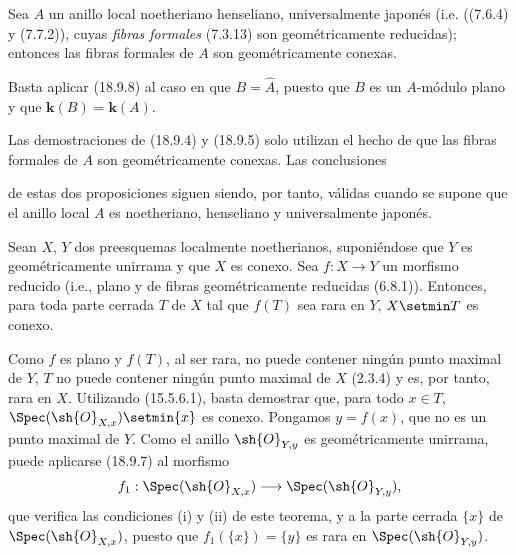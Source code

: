 \begin{corollary}[18.9.9]
\label{IV.18.9.9}
Sea $A$ un anillo local noetheriano henseliano, universalmente japonés \textup{(i.e. ((7.6.4) y (7.7.2)), cuyas \emph{fibras formales} (7.3.13) son geométricamente reducidas)}; entonces las fibras formales de $A$ son geométricamente conexas.
\end{corollary}

Basta aplicar (18.9.8) al caso en que $B=\widehat A$, puesto que $B$ es un $A$-módulo plano y que $\boldsymbol{k}(B)=\boldsymbol{k}(A)$.

\begin{remark}[18.9.10]
\label{IV.18.9.10}
Las demostraciones de (18.9.4) y (18.9.5) solo utilizan el hecho de que las fibras formales de $A$ son geométricamente conexas. Las conclusiones


de estas dos proposiciones siguen siendo, por tanto, válidas cuando se supone que el anillo local $A$ es noetheriano, henseliano y universalmente japonés.
\end{remark}

\begin{corollary}[18.9.11]
\label{IV.18.9.11}
Sean $X$, $Y$ dos preesquemas localmente noetherianos, suponiéndose que $Y$ es geométricamente unirrama y que $X$ es conexo. Sea $f:X\to Y$ un morfismo reducido \textup{(i.e., plano y de fibras geométricamente reducidas (6.8.1))}. Entonces, para toda parte cerrada $T$ de $X$ tal que $f(T)$ sea rara en $Y$, $X\setmin T$ es conexo.
\end{corollary}

Como $f$ es plano y $f(T)$, al ser rara, no puede contener ningún punto maximal de $Y$, $T$ no puede contener ningún punto maximal de $X$ (2.3.4) y es, por tanto, rara en $X$. Utilizando (15.5.6.1), basta demostrar que, para todo $x\in T$, $\Spec(\sh{O}_{X,x})\setmin\{x\}$ es conexo. Pongamos $y=f(x)$, que no es un punto maximal de $Y$. Como el anillo $\sh{O}_{Y,y}$ es geométricamente unirrama, puede aplicarse (18.9.7) al morfismo
\[
  f_1:\Spec(\sh{O}_{X,x})\longrightarrow\Spec(\sh{O}_{Y,y}),
\]
que verifica las condiciones (i) y (ii) de este teorema, y a la parte cerrada $\{x\}$ de $\Spec(\sh{O}_{X,x})$,
puesto que $f_1(\{x\})=\{y\}$ es rara en $\Spec(\sh{O}_{Y,y})$.
